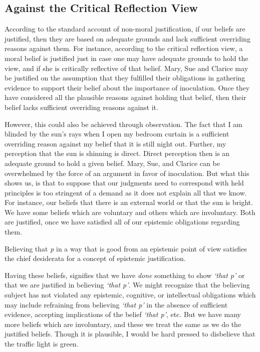 \documentclass[phdthesis,12pt,final]{wuthesis}
\theoremstyle{definition}
\theoremstyle{definition}
\theoremstyle{definition}
\theoremstyle{definition}
\theoremstyle{remark}
\begin{document}
\subsection*{Against the Critical Reflection View}\label{against-the-critical-reflection-view-1}

According to the standard account of non-moral justification, if our beliefs are justified, then they are based on adequate grounds and lack sufficient overriding reasons against them. For instance, according to the critical reflection view, a moral belief is justified just in case one may have adequate grounds to hold the view, and if she is critically reflective of that belief. Mary, Sue and Clarice may be justified on the assumption that they fulfilled their obligations in gathering evidence to support their belief about the importance of inoculation. Once they have considered all the plausible reasons against holding that belief, then their belief lacks sufficient overriding reasons against it.

However, this could also be achieved through observation. The fact that I am blinded by the sun's rays when I open my bedroom curtain is a sufficient overriding reason against my belief that it is still night out. Further, my perception that the sun is shinning is direct. Direct perception then is an adequate ground to hold a given belief. Mary, Sue, and Clarice can be overwhelmed by the force of an argument in favor of inoculation. But what this shows us, is that to suppose that our judgments need to correspond with held principles is too stringent of a demand as it does not explain all that we know. For instance, our beliefs that there is an external world or that the sun is bright. We have some beliefs which are voluntary and others which are involuntary. Both are justified, once we have satisfied all of our epistemic obligations regarding them.

Believing that \emph{p} in a way that is good from an epistemic point of view satisfies the chief desiderata for a concept of epistemic justification.

Having these beliefs, signifies that we have \emph{done} something to show \emph{`that p'} or that we are justified in believing \emph{`that p'}. We might recognize that the believing subject has not violated any epistemic, cognitive, or intellectual obligations which may include refraining from believing \emph{`that p'} in the absence of sufficient evidence, accepting implications of the belief \emph{`that p'}, etc. But we have many more beliefs which are involuntary, and these we treat the same as we do the justified beliefs. Though it is plausible, I would be hard pressed to disbelieve that the traffic light is green.
\end{document}
